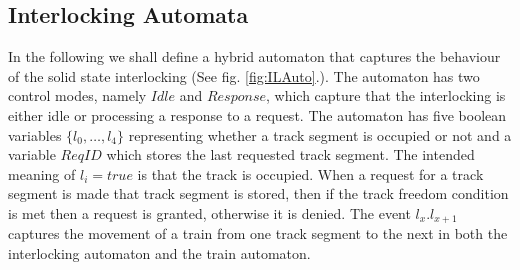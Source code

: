 \subsection*{Interlocking Automata}
In the following we shall define a hybrid automaton that captures the behaviour of the solid state interlocking (See fig. \ref{fig:ILAuto}.).  The automaton has two control modes, namely $Idle$ and $Response$, which capture that the interlocking is either idle or processing a response to a request.  The automaton has five boolean variables $\{ l_0, \ldots ,l_4 \}$ representing whether a track segment is occupied or not and a variable $ReqID$ which stores the last requested track segment. The intended meaning of $l_i = true$ is that the track is occupied.  When a request for a track segment is made that track segment is stored, then if the track freedom condition is met then a request is granted, otherwise it is denied. The event $l_x.l_{x+1}$ captures the movement of a train from one track segment to the next in both the interlocking automaton and the train automaton.
\medskip
